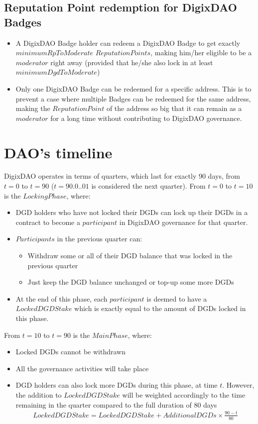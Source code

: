 \documentclass[11pt,a4paper,titlepage]{article}
\begin{document}
{	\subsection{Reputation Point redemption for DigixDAO Badges}{
		\begin{itemize}
			\item A DigixDAO Badge holder can redeem a DigixDAO Badge to get exactly $minimumRpToModerate$ $Reputation Points$, making him/her eligible to be a $moderator$ right away (provided that he/she also lock in at least $minimumDgdToModerate$)
			\item Only one DigixDAO Badge can be redeemed for a specific address. This is to prevent a case where multiple Badges can be redeemed for the same address, making the $Reputation Point$ of the address so big that it can remain as a $moderator$ for a long time without contributing to DigixDAO governance.
		\end{itemize}
	}
}

\section{DAO's timeline}{
	DigixDAO operates in terms of quarters, which last for exactly 90 days, from $t=0$ to $t=90$ ($t=90.0..01$ is considered the next quarter).
	From $t=0$ to $t=10$ is the $Locking Phase$, where:
	\begin{itemize}
		\item DGD holders who have not locked their DGDs can lock up their DGDs in a contract to become a $participant$ in DigixDAO governance for that quarter. 
		\item $Participants$ in the previous quarter can:
		\begin{itemize}
			\item Withdraw some or all of their DGD balance that was locked in the previous quarter
			\item Just keep the DGD balance unchanged or top-up some more DGDs
		\end{itemize}
		\item At the end of this phase, each $participant$ is deemed to have a $Locked DGD Stake$ which is exactly equal to the amount of DGDs locked in this phase.
	\end{itemize}
	From $t=10$ to $t=90$ is the $Main Phase$, where:
	\begin{itemize}
		\item Locked DGDs cannot be withdrawn
		\item All the governance activities will take place
		\item DGD holders can also lock more DGDs during this phase, at time $t$. However, the addition to $Locked DGD Stake$ will be weighted accordingly to the time remaining in the quarter compared to the full duration of 80 days
		\begin{align*}
			Locked DGD Stake = Locked DGD Stake + Additional DGDs \times \frac{90-t}{80}
		\end{align*}
	\end{itemize}
}
\end{document}
